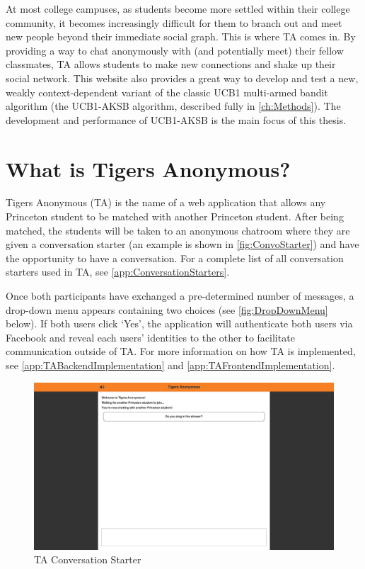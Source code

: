 At most college campuses, as students become more settled within their college community, it becomes increasingly difficult for them to branch out and meet new people beyond their immediate social graph. This is where TA comes in. By providing a way to chat anonymously with (and potentially meet) their fellow classmates, TA allows students to make new connections and shake up their social network. This website also provides a great way to develop and test a new, weakly context-dependent variant of the classic UCB1 multi-armed bandit algorithm (the UCB1-AKSB algorithm, described fully in \autoref{ch:Methods}). The development and performance of UCB1-AKSB is the main focus of this thesis.

\section{What is Tigers Anonymous?}

Tigers Anonymous (TA) is the name of a web application that allows any Princeton student to be matched with another Princeton student. After being matched, the students will be taken to an anonymous chatroom where they are given a conversation starter (an example is shown in \autoref{fig:ConvoStarter}) and have the opportunity to have a conversation. For a complete list of all conversation starters used in TA, see \autoref{app:ConversationStarters}.

Once both participants have exchanged a pre-determined number of messages, a drop-down menu appears containing two choices (see \autoref{fig:DropDownMenu} below). If both users click `Yes', the application will authenticate both users via Facebook and reveal each users' identities to the other to facilitate communication outside of TA. For more information on how TA is implemented, see \autoref{app:TABackendImplementation} and \autoref{app:TAFrontendImplementation}.

\begin{figure}[h]
\centering
\includegraphics[trim= 120mm 250mm 120mm 0mm, clip, scale=0.36]{./Figures/ConversationStarter}
\caption{TA Conversation Starter}
\label{fig:ConvoStarter}
\end{figure}

